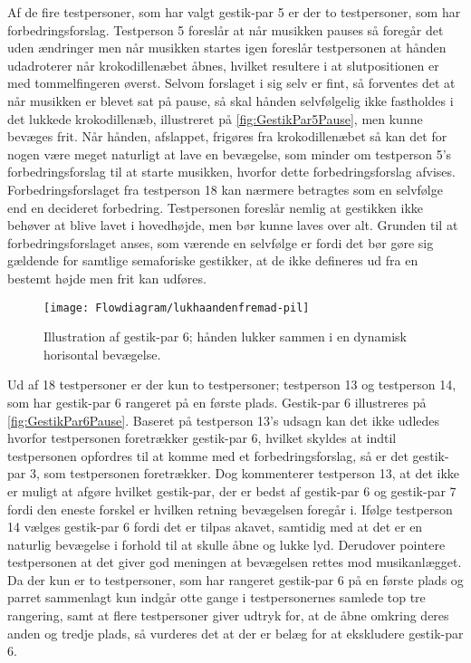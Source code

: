 Af de fire testpersoner, som har valgt gestik-par 5 er der to testpersoner, som har forbedringsforslag. Testperson 5 foreslår at når musikken pauses så foregår det uden ændringer men når musikken startes igen foreslår testpersonen at hånden udadroterer når krokodillenæbet åbnes, hvilket resultere i at slutpositionen er med tommelfingeren øverst. Selvom forslaget i sig selv er fint, så forventes det at når musikken er blevet sat på pause, så skal hånden selvfølgelig ikke fastholdes i det lukkede krokodillenæb, illustreret på \autoref{fig:GestikPar5Pause}, men kunne bevæges frit. Når hånden, afslappet, frigøres fra krokodillenæbet så kan det for nogen være meget naturligt at lave en bevægelse, som minder om testperson 5's forbedringsforslag til at starte musikken, hvorfor dette forbedringsforslag afvises. Forbedringsforslaget fra testperson 18 kan nærmere betragtes som en selvfølge end en decideret forbedring. Testpersonen foreslår nemlig at gestikken ikke behøver at blive lavet i hovedhøjde, men bør kunne laves over alt. Grunden til at forbedringsforslaget anses, som værende en selvfølge er fordi det bør gøre sig gældende for samtlige semaforiske gestikker, at de ikke defineres ud fra en bestemt højde men frit kan udføres.
%
\begin{figure}[H]
	\centering
	\texttt{[image: Flowdiagram/lukhaandenfremad-pil]}
	\caption{Illustration af gestik-par 6; hånden lukker sammen i en dynamisk horisontal bevægelse.}
	\label{fig:GestikPar6Pause}
\end{figure}
\noindent
% 
Ud af 18 testpersoner er der kun to testpersoner; testperson 13 og testperson 14, som har gestik-par 6 rangeret på en første plads. Gestik-par 6 illustreres på \autoref{fig:GestikPar6Pause}. Baseret på testperson 13's udsagn kan det ikke udledes hvorfor testpersonen foretrækker gestik-par 6, hvilket skyldes at indtil testpersonen opfordres til at komme med et forbedringsforslag, så er det gestik-par 3, som testpersonen foretrækker. Dog kommenterer testperson 13, at det ikke er muligt at afgøre hvilket gestik-par, der er bedst af gestik-par 6 og gestik-par 7 fordi den eneste forskel er hvilken retning bevægelsen foregår i. Ifølge testperson 14 vælges gestik-par 6 fordi det er tilpas akavet, samtidig med at det er en naturlig bevægelse i forhold til at skulle åbne og lukke lyd. Derudover pointere testpersonen at det giver god meningen at bevægelsen rettes mod musikanlægget. Da der kun er to testpersoner, som har rangeret gestik-par 6 på en første plads og parret sammenlagt kun indgår otte gange i testpersonernes samlede top tre rangering, samt at flere testpersoner giver udtryk for, at de åbne omkring deres anden og tredje plads, så vurderes det at der er belæg for at ekskludere gestik-par 6. 
